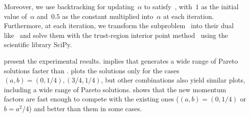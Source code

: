 \documentclass[../main]{subfiles}
\begin{document}
Moreover, we use backtracking for updating~$\alpha$ to satisfy~, with~$1$ as the initial value of~$\alpha$ and~$0.5$ as the constant multiplied into~$\alpha$ at each iteration.
Furthermore, at each iteration, we transform the subproblem~ into their dual like~ and solve them with the trust-region interior point method~\cite{Byrd1999} using the scientific library SciPy.

 present the experimental results.
 implies that  generates a wide range of Pareto solutions faster than .
 plots the solutions only for the cases~$(a, b) = (0, 1 / 4), (3 / 4, 1 / 4)$, but other combinations also yield similar plots, including a wide range of Pareto solutions.
 shows that the new momentum factors are fast enough to compete with the existing ones ($(a, b) = (0, 1/4)$ or $b = a^2/4$) and better than them in some cases.
\end{document}
